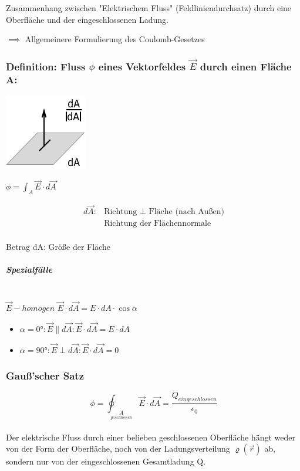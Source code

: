 \documentclass[11pt]{article}
\begin{document}
Zusammenhang zwischen "Elektrischem Fluss" (Feldliniendurchsatz) durch eine Oberfläche und der eingeschlossenen Ladung.

$\implies$ Allgemeinere Formulierung des Coulomb-Gesetzes

\subsubsection{Definition: Fluss $\phi$ eines Vektorfeldes $\vec{E}$ durch einen Fläche A:}

\includegraphics{skizzen/14/14_6B1}


$\phi= \int_A \vec{E}\cdot d\vec{A}$

\begin{align*}
	d\vec{A}:&\text{Richtung }\perp \text{ Fläche (nach Außen)}\\
	&\text{Richtung der Flächennormale}
\end{align*}\\

Betrag dA: Größe der Fläche

\subparagraph{Spezialfälle}\\

$\vec{E}-homogen$
$\vec{E}\cdot d\vec{A}= E\cdot dA\cdot \cos\alpha$

\begin{itemize}
	\item $\alpha=0°: \vec{E}\parallel d\vec{A}: \vec{E}\cdot d\vec{A}=E\cdot dA$\\
	\item $\alpha=90°: \vec{E}\perp d\vec{A}: \vec{E}\cdot d\vec{A}=0$
\end{itemize}

\subsubsection{Gauß'scher Satz}

$$\boxed{\displaystyle\phi=\oint_{\underset{geschlossen}{A}}\vec{E}\cdot d\vec{A}=\frac{Q_{eingeschlossen}}{\epsilon_0}}$$\\

Der elektrische Fluss durch einer belieben geschlossenen Oberfläche hängt weder von der Form der Oberfläche, noch von der Ladungsverteilung $\varrho(\vec{r})$ ab, sondern nur von der eingeschlossenen Gesamtladung Q.\\
\end{document}
